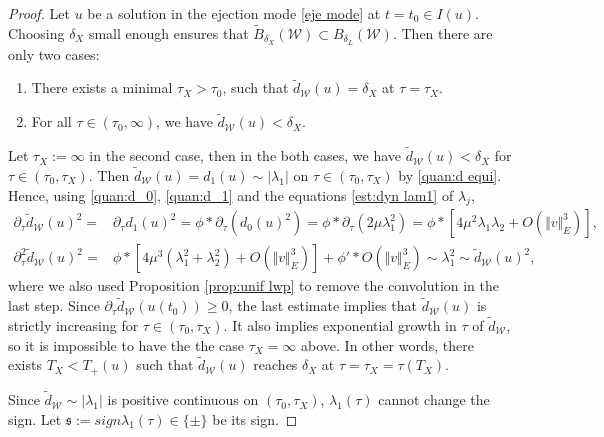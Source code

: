 \documentclass[reqno, 11pt]{amsart}
\numberwithin{equation}{section}
\theoremstyle{plain}
\theoremstyle{definition}
\numberwithin{equation}{section}
\numberwithin{theorem}{section}
\numberwithin{equation}{section}
\numberwithin{equation}{section}
\numberwithin{theorem}{section}
\begin{document}
	\begin{proof}
		Let $u$ be a solution in the ejection mode \eqref{eje mode} at $t=t_0 \in I(u)$. Choosing $\delta_{X}$ small enough ensures that $ \widetilde{B}_{\delta_{X}}(\mathcal{W})\subset  B_{\delta_{L}}(\mathcal{W})$. Then there are only two cases:
		\begin{enumerate}
			\item[$(1)$] There exists a minimal $\tau_{X}>\tau_{0}$, such that $\widetilde{d}_{\mathcal{W}}(u)=\delta_{X}$ at $\tau=\tau_{X}$. 
			\item[$(2)$] For all $\tau\in(\tau_0,\infty)$, we have $\widetilde{d}_{\mathcal{W}}(u)<\delta_{X}$.
		\end{enumerate}
		Let $\tau_{X}:=\infty$ in the second case, then in the both cases, we have $\widetilde{d}_{\mathcal{W}}(u)< \delta_{X}$ for $\tau\in(\tau_0,\tau_X)$. Then $\widetilde{d}_{\mathcal{W}}(u)=d_1(u)\sim |\lambda_{1}|$ on $\tau\in(\tau_0,\tau_X)$ by \eqref{quan:d equi}. Hence, using \eqref{quan:d_0}, \eqref{quan:d_1} and the equations \eqref{est:dyn lam1} of $\lambda_{j}$,
		\begin{equation*}
		\begin{aligned}
		\partial_{\tau}\widetilde{d}_{\mathcal{W}}(u)^2=&\partial_{\tau}d_1(u)^2=\phi * \partial_{\tau}(d_0(u)^2)=\phi * \partial_{\tau}(2\mu\lambda_{1}^2)=\phi * [4\mu^2 \lambda_{1}\lambda_{2}+O(\Vert v \Vert_{E}^3)],\\ \partial_{\tau}^2\widetilde{d}_{\mathcal{W}}(u)^2=&\phi *[4\mu^3(\lambda_{1}^2+\lambda_{2}^2)+O(\Vert v \Vert_{E}^3)]+\phi'*O(\Vert v \Vert_{E}^3)\sim \lambda_{1}^2\sim \widetilde{d}_{\mathcal{W}}(u)^2,
		\end{aligned}
		\end{equation*}
		where we also used Proposition \ref{prop:unif lwp} to remove the convolution in the last step. Since $\partial_{\tau}\widetilde{d}_{\mathcal{W}}(u(t_0))\geq0$, the last estimate implies that $\widetilde{d}_{\mathcal{W}}(u)$ is strictly increasing for $\tau\in(\tau_0,\tau_X)$. It also implies exponential growth in $\tau$ of $\widetilde{d}_{\mathcal{W}}$, so it is impossible to have the the case $\tau_X=\infty$ above. In other words, there exists $T_X<T_+(u)$ such that $\widetilde{d}_{\mathcal{W}}(u)$ reaches $\delta_{X}$ at $\tau=\tau_X=\tau(T_X)$.
		
		Since $\widetilde{d}_{\mathcal{W}}\sim |\lambda_{1}|$ is positive continuous on $(\tau_0,\tau_X)$, $\lambda_{1}(\tau)$ cannot change the sign. Let $\mathfrak{s}:=sign\lambda_{1}(\tau)\in\{\pm\}$ be its sign.
		

\end{proof}
\end{document}
